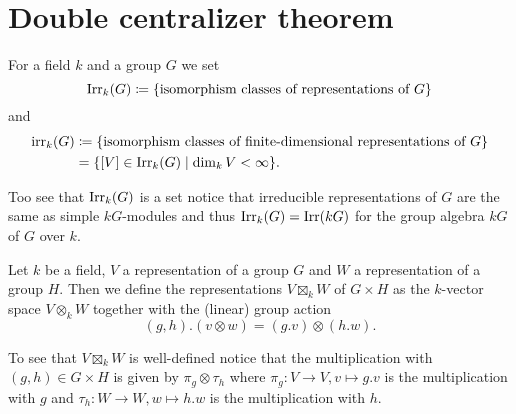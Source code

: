 \section{Double centralizer theorem}


\begin{defi}
 For a field $k$ and a group $G$ we set
 \[
  \operatorname{Irr}_k(G) \coloneqq \{\text{isomorphism classes of representations of $G$}\}
 \]
 and
 \begin{align*}
  \operatorname{irr}_k(G)
  &\coloneqq \{\text{isomorphism classes of finite-dimensional representations of $G$}\} \\
  &= \{[V] \in \operatorname{Irr}_k(G) \mid \dim_k V < \infty\}.
 \end{align*}
\end{defi}


Too see that $\operatorname{Irr}_k(G)$ is a set notice that irreducible representations of $G$ are the same as simple $kG$-modules and thus $\operatorname{Irr}_k(G) = \operatorname{Irr}(kG)$ for the group algebra $kG$ of $G$ over $k$.


\begin{defi}
 Let $k$ be a field, $V$ a representation of a group $G$ and $W$ a representation of a group $H$. Then we define the representations $V \boxtimes_k W$ of $G \times H$ as the $k$-vector space $V \otimes_k W$ together with the (linear) group action
 \[
  (g,h).(v \otimes w) = (g.v) \otimes (h.w).
 \]
\end{defi}


To see that $V \boxtimes_k W$ is well-defined notice that the multiplication with $(g,h) \in G \times H$ is given by $\pi_g \otimes \tau_h$ where $\pi_g \colon V \to V, v \mapsto g.v$ is the multiplication with $g$ and $\tau_h \colon W \to W, w \mapsto h.w$ is the multiplication with $h$.


